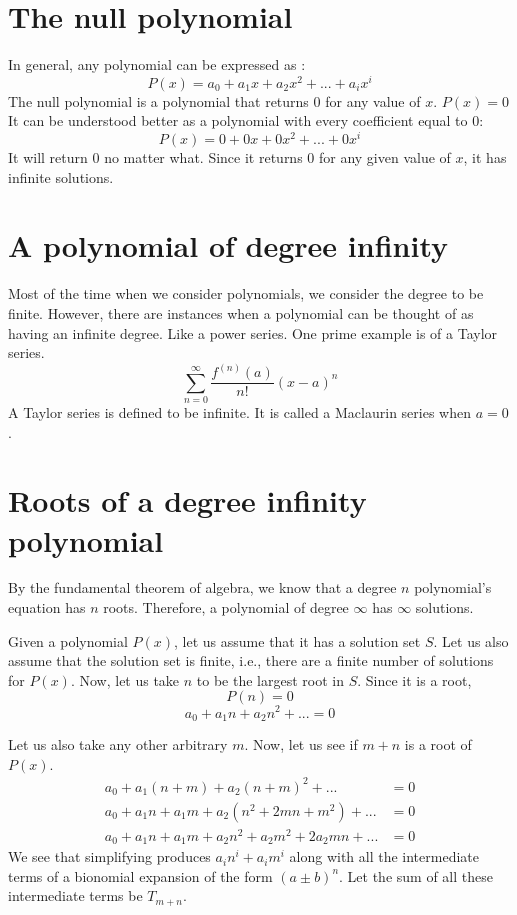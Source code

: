 \documentclass[preprint,12pt]{elsarticle}
\begin{document}

\section{The null polynomial}
In general, any polynomial can be expressed as :
\[
    P(x) = a_0 + a_1x + a_2x^2 + ...  + a_ix^i
\]
The null polynomial is a polynomial that returns 0 for any value of $x$.
$P(x) = 0$
It can be understood better as a polynomial with every coefficient equal to 0:
\[
    P(x) = 0 + 0x + 0x^2 + ... + 0x^i
\]
It will return 0 no matter what. Since it returns 0 for any given value of $x$, it has infinite solutions.\cite{1137202}
\label{S:1}

\section{A polynomial of degree infinity}

Most of the time when we consider polynomials, we consider the degree to be finite.
However, there are instances when a polynomial can be thought of as having an infinite degree. Like a power series.
One prime example is of a Taylor series.\cite{1137203}
\[
    \sum_{n = 0}^{\infty} \frac{f^{(n)} (a)}{n!} (x-a)^n
\]
A Taylor series is defined to be infinite.
It is called a Maclaurin series when $a = 0$.
\label{S:2}
\section{Roots of a degree infinity polynomial}
By the fundamental theorem of algebra, we know that a degree $n$ polynomial's equation has $n$ roots.
Therefore, a polynomial of degree $\infty$ has $\infty$ solutions.

Given a polynomial $P(x)$, let us assume that it has a solution set $S$.
Let us also assume that the solution set is finite, i.e., there are a finite number of solutions for $P(x)$.
Now, let us take $n$ to be the largest root in $S$.
Since it is a root, 
\[
    P(n) = 0
\]
\begin{equation} \label{n_root}
     a_0 + a_1n + a_2n^2 + ... = 0
\end{equation}
   
Let us also take any other arbitrary $m$.
Now, let us see if $m + n$ is a root of $P(x)$.
\begin{align*}
    a_0 + a_1(n + m) + a_2(n + m)^2 + ... &= 0\\
    a_0 + a_1n + a_1m + a_2(n^2 + 2mn + m^2) + ... &= 0\\
    a_0 + a_1n + a_1m + a_2n^2 + a_2m^2 + 2a_2mn + ... &= 0
\end{align*}
We see that simplifying produces $a_in^i + a_im^i$ along with all the intermediate terms of a bionomial expansion of the form $(a \pm b)^n$.
Let the sum of all these intermediate terms be $T_{m + n}$.
\end{document}
